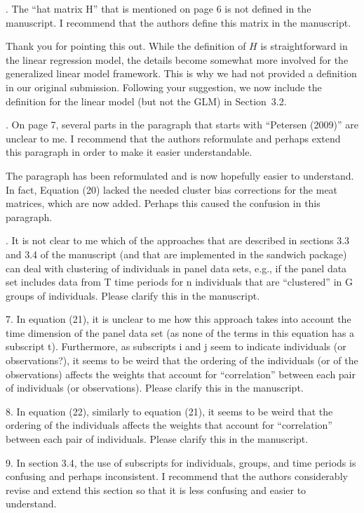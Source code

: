 \documentclass[american,foldmarks=false]{uibklttr}
\newenvironment{review}{\fontshape{\itdefault}\fontseries{\bfdefault} \selectfont \smallskip}{\par}
\begin{document}
\begin{review}
4. The ``hat matrix H'' that is mentioned on page 6 is not
defined in the manuscript. I recommend that the authors define this matrix in
the manuscript.
\end{review}

Thank you for pointing this out. While the definition of $H$ is straightforward
in the linear regression model, the details become somewhat more involved for
the generalized linear model framework. This is why we had not provided a
definition in our original submission. Following your suggestion, we now
include the definition for the linear model (but not the GLM) in Section~3.2.


\begin{review}
5. On page 7, several parts in the paragraph that starts with
``Petersen (2009)'' are unclear to me. I recommend that the authors reformulate
and perhaps extend this paragraph in order to make it easier understandable.
\end{review}

The paragraph has been reformulated and is now hopefully easier to understand.
In fact, Equation (20) lacked the needed cluster bias corrections for the meat
matrices, which are now added. Perhaps this caused the confusion in this
paragraph.


\begin{review}
6. It is not clear to me which of the approaches that are
described in sections 3.3 and 3.4 of the manuscript (and that are implemented in
the sandwich package) can deal with clustering of individuals in panel data
sets, e.g., if the panel data set includes data from T time periods for n
individuals that are ``clustered'' in G groups of individuals. Please clarify
this in the manuscript.

7. In equation (21), it is unclear to me how this approach takes
into account the time dimension of the panel data set (as none of the terms in
this equation has a subscript t). Furthermore, as subscripts i and j seem to
indicate individuals (or observations?), it seems to be weird that the ordering
of the individuals (or of the observations) affects the weights that account for
``correlation'' between each pair of individuals (or observations). Please
clarify this in the manuscript.

8. In equation (22), similarly to equation (21), it seems to be
weird that the ordering of the individuals affects the weights that account for
``correlation'' between each pair of individuals. Please clarify this in the
manuscript.

9. In section 3.4, the use of subscripts for individuals,
groups, and time periods is confusing and perhaps inconsistent. I recommend that
the authors considerably revise and extend this section so that it is less
confusing and easier to understand.
\end{review}
\end{document}

